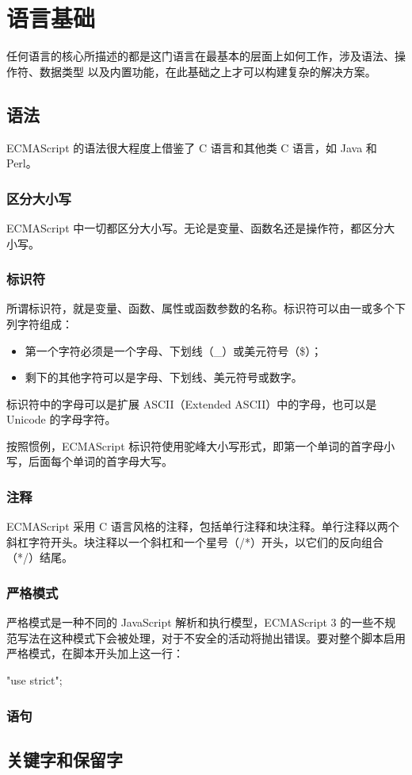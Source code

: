 \chapter{语言基础}
任何语言的核心所描述的都是这门语言在最基本的层面上如何工作，涉及语法、操作符、数据类型
以及内置功能，在此基础之上才可以构建复杂的解决方案。
\section{语法}
ECMAScript 的语法很大程度上借鉴了 C 语言和其他类 C 语言，如 Java 和 Perl。
\subsection{区分大小写}
ECMAScript 中一切都区分大小写。无论是变量、函数名还是操作符，都区分大小写。
\subsection{标识符}
所谓标识符，就是变量、函数、属性或函数参数的名称。标识符可以由一或多个下列字符组成：
\begin{itemize}
    \item 第一个字符必须是一个字母、下划线（\_）或美元符号（\$）；
    \item 剩下的其他字符可以是字母、下划线、美元符号或数字。
\end{itemize}
标识符中的字母可以是扩展 ASCII（Extended ASCII）中的字母，也可以是 Unicode 的字母字符。

按照惯例，ECMAScript 标识符使用驼峰大小写形式，即第一个单词的首字母小写，后面每个单词的首字母大写。


\subsection{注释}
ECMAScript 采用 C 语言风格的注释，包括单行注释和块注释。单行注释以两个斜杠字符开头。块注释以一个斜杠和一个星号（/*）开头，以它们的反向组合（*/）结尾。
\subsection{严格模式}
严格模式是一种不同的 JavaScript 解析和执行模型，ECMAScript 3 的一些不规范写法在这种模式下会被处理，对于不安全的活动将抛出错误。要对整个脚本启用严格模式，在脚本开头加上这一行：
\begin{js}
    "use strict";
\end{js}
\subsection{语句}
\section{关键字和保留字\label{keywords}}